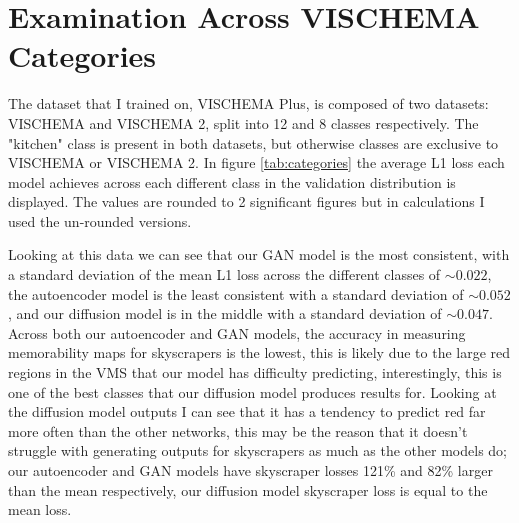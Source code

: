 \documentclass{UoYCSproject}
\begin{document}
\section{Examination Across VISCHEMA Categories}

The dataset that I trained on, VISCHEMA Plus, is composed of two datasets: VISCHEMA and VISCHEMA 2, split into 12 and 8 classes respectively. The "kitchen" class is present in both datasets, but otherwise classes are exclusive to VISCHEMA or VISCHEMA 2. In figure \ref{tab:categories} the average L1 loss each model achieves across each different class in the validation distribution is displayed. The values are rounded to 2 significant figures but in calculations I used the un-rounded versions. 

Looking at this data we can see that our GAN model is the most consistent, with a standard deviation of the mean L1 loss across the different classes of \( \sim 0.022\), the autoencoder model is the least consistent with a standard deviation of \( \sim 0.052\), and our diffusion model is in the middle with a standard deviation of \( \sim 0.047\). Across both our autoencoder and GAN models, the accuracy in measuring memorability maps for skyscrapers is the lowest, this is likely due to the large red regions in the VMS that our model has difficulty predicting, interestingly, this is one of the best classes that our diffusion model produces results for. Looking at the diffusion model outputs I can see that it has a tendency to predict red far more often than the other networks, this may be the reason that it doesn't struggle with generating outputs for skyscrapers as much as the other models do; our autoencoder and GAN models have skyscraper losses 121\% and 82\% larger than the mean respectively, our diffusion model skyscraper loss is equal to the mean loss.

\end{document}
